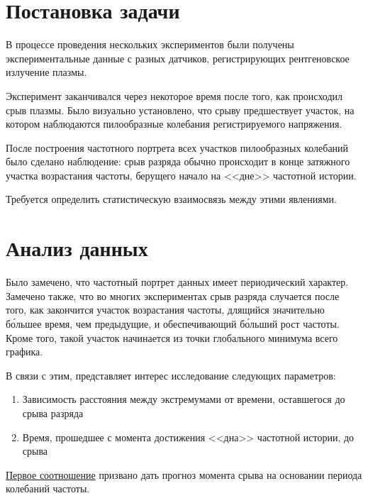 \section{Постановка задачи}

В процессе проведения нескольких экспериментов были получены экспериментальные данные с разных датчиков, регистрирующих рентгеновское излучение плазмы.

Эксперимент заканчивался через некоторое время после того, как происходил срыв плазмы. Было визуально установлено, что срыву предшествует участок, на котором наблюдаются пилообразные колебания регистрируемого напряжения.

После построения частотного портрета всех участков пилообразных колебаний было сделано наблюдение: срыв разряда обычно происходит в конце затяжного участка возрастания частоты, берущего начало на <<дне>> частотной истории.

Требуется определить статистическую взаимосвязь между этими явлениями.

\section{Анализ данных}\label{analysis}

Было замечено, что частотный портрет данных имеет периодический характер. Замечено также, что во многих экспериментах срыв разряда случается после того, как закончится участок возрастания частоты, длящийся значительно б\'{о}льшее время, чем предыдущие, и обеспечивающий б\'{о}льший рост частоты. Кроме того, такой участок  начинается из точки глобального минимума всего графика.

В связи с этим, представляет интерес исследование следующих параметров:
\begin{enumerate}
	\item \label{extremumDist} Зависимость расстояния между экстремумами от времени, оставшегося до срыва разряда
	
	\item \label{timeBottom} Время, прошедшее с момента достижения <<дна>> частотной истории, до срыва
\end{enumerate}


\hyperref[extremumDist]{Первое соотношение} призвано дать прогноз момента срыва на основании периода колебаний частоты. 

